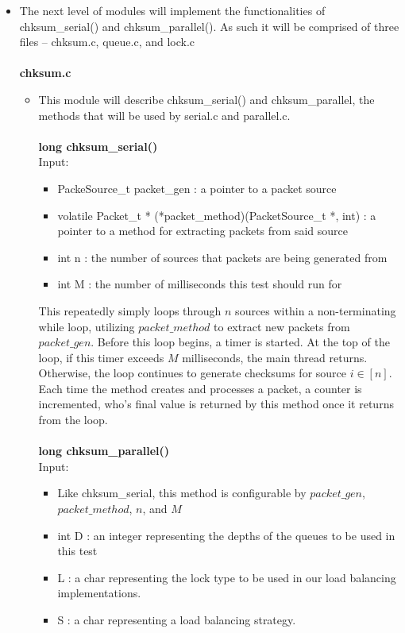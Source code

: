 \documentclass[]{article}
\begin{document}
\begin{itemize}
\begin{itemize}
	\end{itemize}
	\item The next level of modules will implement the functionalities of chksum\_serial() and chksum\_parallel(). As such it will be comprised of three files -- chksum.c, queue.c, and lock.c
	\\\\
	\textbf{chksum.c}
	\begin{itemize}
		\item This module will describe chksum\_serial() and chksum\_parallel, the methods that will be used by serial.c and parallel.c.
		\\\\
		\textbf{long chksum\_serial()}
		\\
		Input:
		\begin{itemize}
			\item PackeSource\_t packet\_gen : a pointer to a packet source
			\item volatile Packet\_t * (*packet\_method)(PacketSource\_t *, int) : a pointer to a method for extracting packets from said source
			\item int n : the number of sources that packets are being generated from
			\item int M : the number of milliseconds this test should run for
		\end{itemize}
		This repeatedly simply loops through $n$ sources within a non-terminating while loop, utilizing $packet\_method$ to extract new packets from $packet\_gen$. Before this loop begins, a timer is started. At the top of the loop, if this timer exceeds $M$ milliseconds, the main thread returns. Otherwise, the loop continues to generate checksums for source $i \in [n]$. Each time the method creates and processes a packet, a counter is incremented, who's final value is returned by this method once it returns from the loop.
		\\\\
		\textbf{long chksum\_parallel()}
		\\
		Input:
		\begin{itemize}
			\item Like chksum\_serial, this method is configurable by $packet\_gen$, $packet\_method$, $n$, and $M$
			\item int D : an integer representing the depths of the queues to be used in this test
			\item L : a char representing the lock type to be used in our load balancing implementations.
			\item S : a char representing a load balancing strategy.

\end{itemize}
\end{itemize}
\end{itemize}
\end{document}
